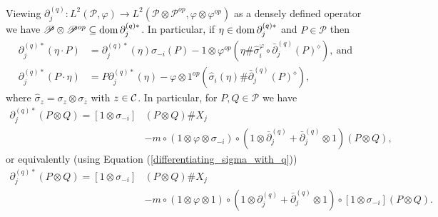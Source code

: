 \begin{cor}\label{difference_quotient_adjoint}
Viewing $\partial_j^{(q)}\colon L^2(\mathscr{P},\varphi)\rightarrow L^2(\mathscr{P}\otimes\mathscr{P}^{op},\varphi\otimes\varphi^{op})$ as a densely defined operator we have $\mathscr{P}\otimes\mathscr{P}^{op}\subseteq \text{dom}\,\partial_j^{(q)*}$. In particular, if $\eta\in \text{dom}\,\partial_j^{(q)*}$ and $P\in\mathscr{P}$ then
	\begin{align*}
		\partial_j^{(q)*}(\eta\cdot P)&=\partial_j^{(q)*}(\eta)\sigma_{-i}(P) - 1\otimes\varphi^{op} \left(\eta\# \hat{\sigma}^{\varphi}_i\circ\bar{\partial}_j^{(q)}(P)^\diamond\right),\ \text{and}\\
		\partial_j^{(q)*}( P\cdot\eta) &= P\partial_j^{(q)*}(\eta) - \varphi\otimes 1^{op}\left( \hat{\sigma}_i(\eta)\# \bar{\partial}_j^{(q)}(P)^\diamond\right),
	\end{align*}
where $\hat{\sigma}_z=\sigma_z\otimes \sigma_{\bar{z}}$ with $z\in \mathcal C$. In particular, for $P,Q\in \mathscr{P}$ we have
	\begin{align}\label{adjoint_formula}
		\partial_j^{(q)*}(P\otimes Q) = [1\otimes\sigma_{-i}]&(P\otimes Q)\# X_j\nonumber\\
								& -m\circ\left( 1\otimes\varphi\otimes \sigma_{-i}\right)\circ\left(1\otimes\bar{\partial}_j^{(q)}+\bar{\partial}_j^{(q)}\otimes 1\right)(P\otimes Q),
	\end{align}
or equivalently (using Equation (\ref{differentiating_sigma_with_q}))
	\begin{align}\label{adjoint_formula_2}
		\partial_j^{(q)*}(P\otimes Q) = [1\otimes\sigma_{-i}]&(P\otimes Q)\#X_j\\
			&-m\circ\left( 1\otimes\varphi\otimes 1\right)\circ\left(1\otimes\partial_j^{(q)}+\bar{\partial}_j^{(q)}\otimes 1\right)\circ[1\otimes\sigma_{-i}](P\otimes Q).\nonumber
	\end{align}
\end{cor}
